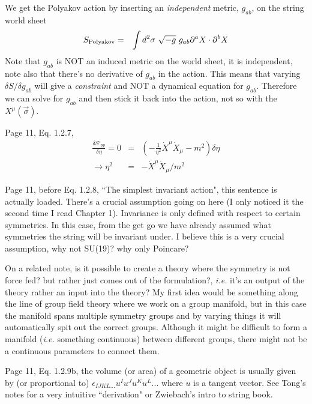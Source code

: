 \documentclass[aps,preprint,preprintnumbers,nofootinbib,showpacs,prd]{revtex4-1}
\newcommand{\ie}{{\it i.e.} }
\newcommand{\nbea}{\begin{eqnarray*}}
\newcommand{\neea}{\end{eqnarray*}}
\begin{document}
We get the Polyakov action by inserting an {\it independent} metric, $g_{ab}$, on the string world sheet
%
\nbea
S_{\rm Polyakov} & = & \int d^2\sigma~ \sqrt{-g} ~ g_{ab} \partial^a X \cdot \partial^b X
\neea
%
Note that $g_{ab}$ is NOT an induced metric on the world sheet, it is independent, note also that there's no derivative of $g_{ab}$ in the action. This means that varying $\delta S/\delta g_{ab}$ will give a {\it constraint} and NOT a dynamical equation for $g_{ab}$. Therefore we can solve for $g_{ab}$ and then stick it back into the action, not so with the $X^\mu(\vec \sigma)$.

Page 11, Eq. 1.2.7,
%
\nbea
\frac{\delta S'_{pp}}{\delta \eta} = 0 & = & \left ( -\frac{1}{\eta^2} \dot X^\mu \dot X_\mu - m^2 \right ) \delta \eta\\
\rightarrow \eta^2 & = & -\dot X^\mu \dot X_\mu / m^2
\neea
%

Page 11, before Eq. 1.2.8, ``The simplest invariant action", this sentence is actually loaded. There's a crucial assumption going on here (I only noticed it the second time I read Chapter 1). Invariance is only defined with respect to certain symmetries. In this case, from the get go we have already assumed what symmetries the string will be invariant under. I believe this is a very crucial assumption, why not SU(19)? why only Poincare? 

On a related note, is it possible to create a theory where the symmetry is not force fed? but rather just comes out of the formulation?, \ie it's an output of the theory rather an input into the theory? My first idea would be something along the line of group field theory where we work on a group manifold, but in this case the manifold spans multiple symmetry groups and by varying things it will automatically spit out the correct groups. Although it might be difficult to form a manifold (\ie something continuous) between different groups, there might not be a continuous parameters to connect them.

Page 11, Eq. 1.2.9b, the volume (or area) of a geometric object is usually given by (or proportional to) $\epsilon_{IJKL ...} u^I u^J u^K u^L ...$ where $u$ is a tangent vector. See Tong's notes for a very intuitive ``derivation" or Zwiebach's intro to string book.
\end{document}
